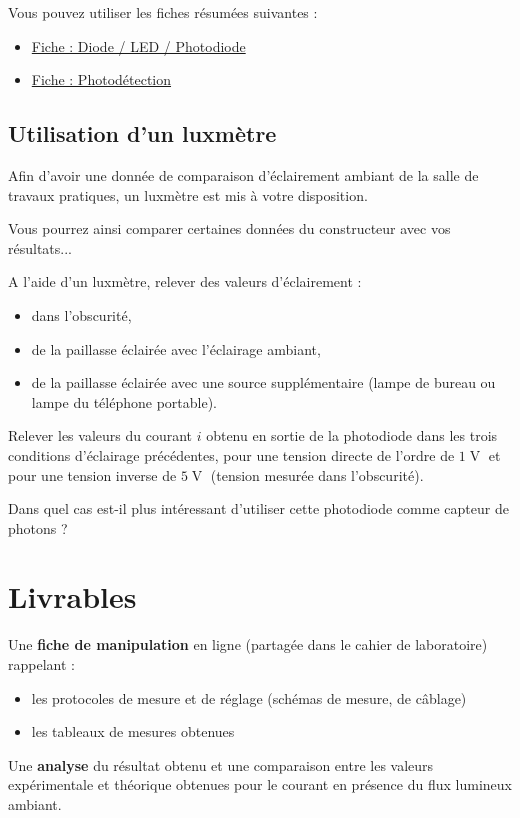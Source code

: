 Vous pouvez utiliser les fiches résumées suivantes : 

\begin{itemize}
	\item \hyperref[fiche:Led]{Fiche : Diode / LED / Photodiode}
	\item \hyperref[fiche:Photodetect]{Fiche : Photodétection}
\end{itemize}

\subsection{Utilisation d'un luxmètre}

Afin d'avoir une donnée de comparaison d'éclairement ambiant de la salle de travaux pratiques, un luxmètre est mis à votre disposition.

Vous pourrez ainsi comparer certaines données du constructeur avec vos résultats...


\Manip A l'aide d'un luxmètre, relever des valeurs d'éclairement :
\begin{itemize}
	\item dans l'obscurité,
	\item de la paillasse éclairée avec l'éclairage ambiant,
	\item de la paillasse éclairée avec une source supplémentaire (lampe de bureau ou lampe du téléphone portable).
\end{itemize}

\Manip Relever les valeurs du courant $i$ obtenu en sortie de la photodiode dans les trois conditions d'éclairage précédentes, pour une tension directe de l'ordre de $1\operatorname{V}$ et pour une tension inverse de $5\operatorname{V}$ (tension mesurée dans l'obscurité).

\Quest Dans quel cas est-il plus intéressant d'utiliser cette photodiode comme capteur de photons ?


\section{Livrables}


Une \textbf{fiche de manipulation} en ligne (partagée dans le cahier de laboratoire) rappelant :

\begin{itemize}
	\item les protocoles de mesure et de réglage (schémas de mesure, de câblage)
	\item les tableaux de mesures obtenues
\end{itemize}

Une \textbf{analyse} du résultat obtenu et une comparaison entre les valeurs expérimentale et théorique obtenues pour le courant en présence du flux lumineux ambiant.

